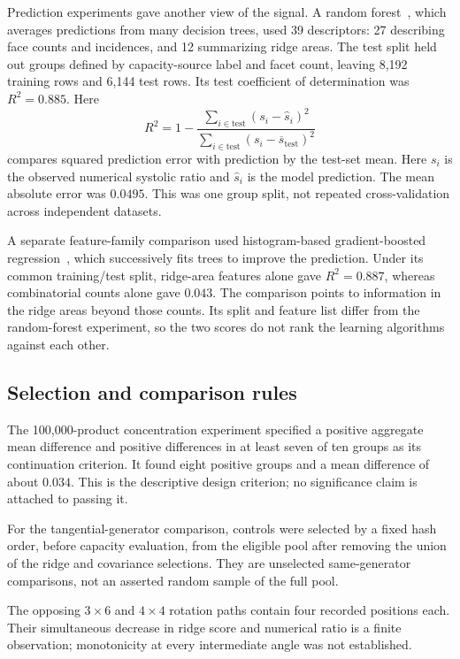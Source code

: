 Prediction experiments gave another view of the signal. A random forest~\cite{dsBreiman2001},
which averages predictions from many decision trees, used 39 descriptors:
27 describing face counts and incidences, and 12 summarizing ridge areas.
The test split held out groups defined by capacity-source label and facet
count, leaving 8,192 training rows and 6,144 test rows. Its test coefficient
of determination was $R^2=0.885$. Here
\[
 R^2=1-\frac{\sum_{i\in\mathrm{test}}(s_i-\widehat s_i)^2}
                   {\sum_{i\in\mathrm{test}}(s_i-\overline s_{\mathrm{test}})^2}
\]
compares squared prediction error with prediction by the test-set mean.
Here $s_i$ is the observed numerical systolic ratio and $\widehat s_i$
is the model prediction.
The mean absolute error was $0.0495$. This was one group split, not repeated
cross-validation across independent datasets.

A separate feature-family comparison used histogram-based gradient-boosted
regression~\cite{dsSklearnHGB}, which successively fits trees to improve the prediction. Under
its common training/test split, ridge-area features alone gave $R^2=0.887$,
whereas combinatorial counts alone gave $0.043$. The comparison points to
information in the ridge areas beyond those counts. Its split and feature
list differ from the random-forest experiment, so the two scores do not rank
the learning algorithms against each other.


\subsection{Selection and comparison rules}\label{app:ds-selection}

The 100,000-product concentration experiment specified a positive aggregate
mean difference and positive differences in at least seven of ten groups
as its continuation criterion. It found eight positive groups and a mean
difference of about $0.034$. This is the descriptive design criterion;
no significance claim is attached to passing it.

For the tangential-generator comparison, controls were selected by a fixed
hash order, before capacity evaluation, from the eligible pool after removing
the union of the ridge and covariance selections. They are unselected
same-generator comparisons, not an asserted random sample of the full pool.

The opposing $3\times6$ and $4\times4$ rotation paths contain four recorded
positions each. Their simultaneous decrease in ridge score and numerical
ratio is a finite observation; monotonicity at every intermediate angle
was not established.

